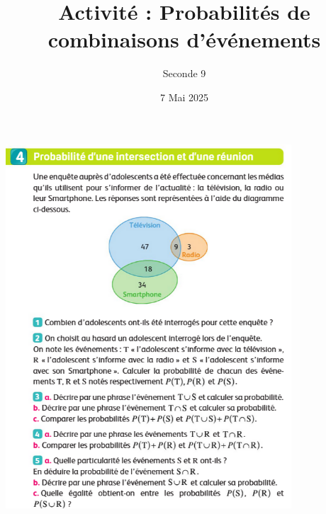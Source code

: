\documentclass{article}
\title{Activité : Probabilités de combinaisons d'événements}
\date{7 Mai 2025}
\author{Seconde 9}
\begin{document}
\maketitle
\begin{center}
\includegraphics[width=0.8\textwidth]{Activite_evenements.png}
\end{center}
\end{document}
